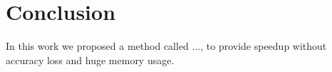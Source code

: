 \chapter{Conclusion}
\label{c:conc}

In this work we proposed a method called ..., to provide speedup without accuracy loss and huge memory usage.
